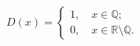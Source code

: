 \documentclass[preview]{standalone}
\begin{document}
\begin{align*}
D(x)=\begin{cases} 1, \quad x \in \mathbb{Q}; \\0, \quad x \in  \mathbb{R} \setminus \mathbb{Q}. \end{cases}
\end{align*}
\end{document}

